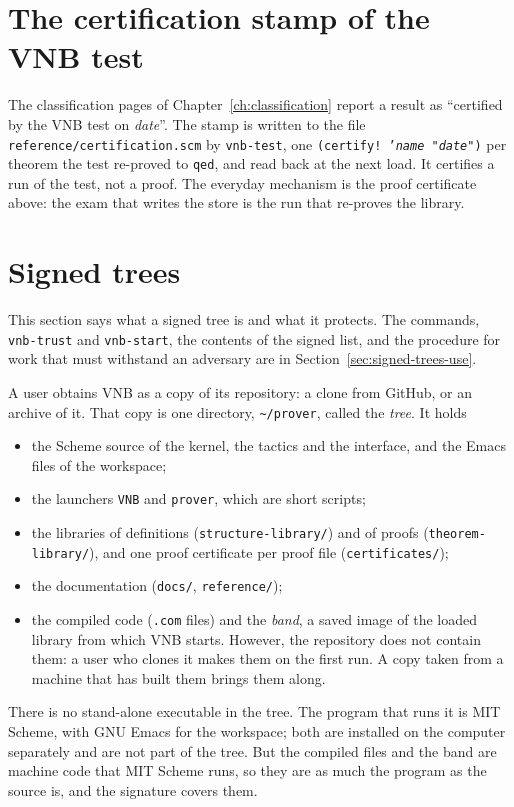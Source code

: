 \section{The certification stamp of the VNB test}\label{sec:test-stamp}

The classification pages of Chapter~\ref{ch:classification} report a
result as ``certified by the VNB test on \textit{date}''.  The stamp is
written to the file \texttt{reference/certification.scm} by
\texttt{vnb-test}, one
\texttt{(certify!\ '\textit{name} "\textit{date}")} per theorem the test
re-proved to \texttt{qed}, and read back at the next load.  It certifies a
run of the test, not a proof.  The everyday mechanism is the proof
certificate above: the exam that writes the store is the run that
re-proves the library.

\section{Signed trees}
\label{sec:signed-trees}

This section says what a signed tree is and what it protects.  The
commands, \texttt{vnb-trust} and \texttt{vnb-start}, the contents of the
signed list, and the procedure for work that must withstand an
adversary are in Section~\ref{sec:signed-trees-use}.

A user obtains VNB as a copy of its repository: a clone from GitHub,
or an archive of it.  That copy is one directory,
\texttt{\textasciitilde/prover}, called the \emph{tree}.  It holds
\begin{itemize}
\item the Scheme source of the kernel, the tactics and the interface,
  and the Emacs files of the workspace;
\item the launchers \texttt{VNB} and \texttt{prover}, which are short
  scripts;
\item the libraries of definitions (\texttt{structure-library/}) and of
  proofs (\texttt{theorem-library/}), and one proof certificate per
  proof file (\texttt{certificates/});
\item the documentation (\texttt{docs/}, \texttt{reference/});
\item the compiled code (\texttt{.com} files) and the \emph{band}, a
  saved image of the loaded library from which VNB starts.  However,
  the repository does not contain them: a user who clones it makes them on
  the first run.  A copy taken from a machine that has built them
  brings them along.
\end{itemize}
There is no stand-alone executable in the tree.  The program that runs
it is MIT Scheme, with GNU Emacs for the workspace; both are installed
on the computer separately and are not part of the tree.  But the
compiled files and the band are machine code that MIT Scheme runs, so
they are as much the program as the source is, and the signature
covers them.

